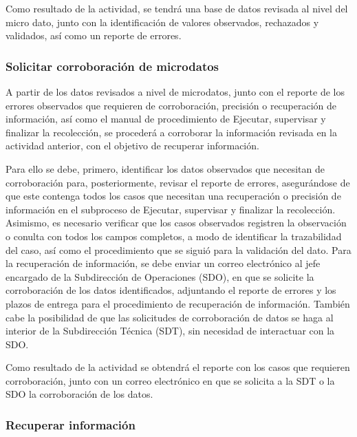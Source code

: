 \documentclass[
]{article}
\begin{document}
Como resultado de la actividad, se tendrá una base de datos revisada al nivel del micro dato, junto con la identificación de valores observados, rechazados y validados, así como un reporte de errores.

\hypertarget{solicitar-corroboraciuxf3n-de-microdatos}{%
\subsubsection{Solicitar corroboración de microdatos}\label{solicitar-corroboraciuxf3n-de-microdatos}}

A partir de los datos revisados a nivel de microdatos, junto con el reporte de los errores observados que requieren de corroboración, precisión o recuperación de información, así como el manual de procedimiento de Ejecutar, supervisar y finalizar la recolección, se procederá a corroborar la información revisada en la actividad anterior, con el objetivo de recuperar información.

Para ello se debe, primero, identificar los datos observados que necesitan de corroboración para, posteriormente, revisar el reporte de errores, asegurándose de que este contenga todos los casos que necesitan una recuperación o precisión de información en el subproceso de Ejecutar, supervisar y finalizar la recolección. Asimismo, es necesario verificar que los casos observados registren la observación o conulta con todos los campos completos, a modo de identificar la trazabilidad del caso, así como el procedimiento que se siguió para la validación del dato. Para la recuperación de información, se debe enviar un correo electrónico al jefe encargado de la Subdirección de Operaciones (SDO), en que se solicite la corroboración de los datos identificados, adjuntando el reporte de errores y los plazos de entrega para el procedimiento de recuperación de información. También cabe la posibilidad de que las solicitudes de corroboración de datos se haga al interior de la Subdirección Técnica (SDT), sin necesidad de interactuar con la SDO.

Como resultado de la actividad se obtendrá el reporte con los casos que requieren corroboración, junto con un correo electrónico en que se solicita a la SDT o la SDO la corroboración de los datos.

\hypertarget{recuperar-informaciuxf3n}{%
\subsubsection{Recuperar información}\label{recuperar-informaciuxf3n}}
\end{document}
